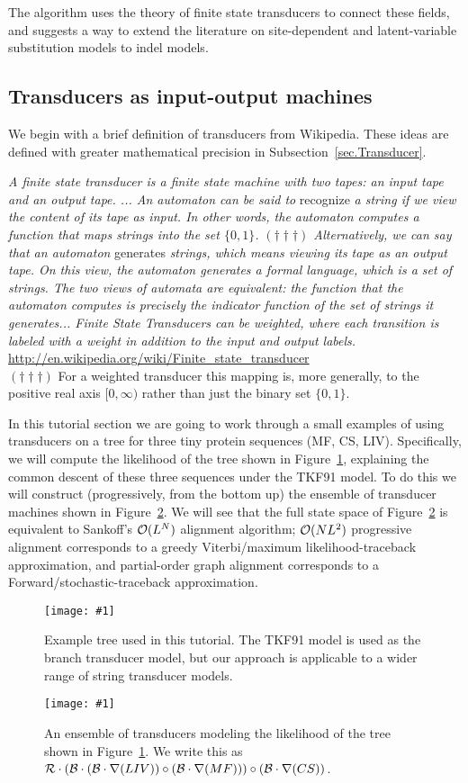 \documentclass{article}
\newcommand{\secref}[1]{Subsection~\ref{sec.#1}}
\newcommand{\figref}[1]{Figure~\ref{Figures.#1}}
\newcommand{\figlabel}[1]{\label{Figures.#1}}
\newcommand{\easyfig}[4]{
\begin{figure}
\texttt{[image: \#1]}
\caption{ \figlabel{#3} #4}
\end{figure}}
\newcommand{\pdffig}[2]{\easyfig{#1-fig.pdf}{}{#1}{#2}}
\newcommand\tkf{{\cal B}}
\newcommand\tkfroot{{\cal R}}
\newcommand\fork{\circ}
\newcommand\recognize{\nabla}
\begin{document}
The algorithm uses the theory of finite state transducers to connect these fields,
and suggests a way to extend the literature on
site-dependent and latent-variable substitution models \cite{Yang94,Bruno96,YangEtAl2000,HolmesRubin2002b}
to indel models.


\subsection{Transducers as input-output machines}

We begin with a brief definition of transducers from Wikipedia.  
These ideas are defined with greater mathematical precision in \secref{Transducer}.

{\em A finite state transducer is a finite state machine with two tapes: an input tape and an output tape. ... An automaton can be said to } recognize {\em a string if we view the content of its tape as input. In other words, the automaton computes a function that maps strings into the set $\{0,1\}$. $(\dagger\dagger\dagger)$ Alternatively, we can say that an automaton } generates {\em strings, which means viewing its tape as an output tape. On this view, the automaton generates a formal language, which is a set of strings. The two views of automata are equivalent: the function that the automaton computes is precisely the indicator function of the set of strings it generates... Finite State Transducers can be weighted, where each transition is labeled with a weight in addition to the input and output labels. }
\url{http://en.wikipedia.org/wiki/Finite_state_transducer}
\\
$(\dagger\dagger\dagger)$ For a weighted transducer this mapping is,
more generally, to the positive real axis $[0,\infty)$
rather than just the binary set $\{0,1\}$.

In this tutorial section we are going to work through a small examples of using transducers on a tree
for three tiny protein sequences (MF, CS, LIV).
Specifically, we will compute the likelihood of the tree shown in \figref{cs-mf-liv-tree},
explaining the common descent of these three sequences
under the TKF91 model.
To do this we will construct (progressively, from the bottom up) the ensemble of transducer machines shown in \figref{cs-mf-liv-machines}.
We will see that the full state space of \figref{cs-mf-liv-machines} is equivalent to Sankoff's ${\cal O}(L^N)$ alignment algorithm;
${\cal O}(NL^2)$ progressive alignment corresponds to a greedy Viterbi/maximum likelihood-traceback approximation,
and partial-order graph alignment corresponds to a Forward/stochastic-traceback approximation.
\pdffig{cs-mf-liv-tree}{Example tree used in this tutorial.  
The TKF91 model is used as the branch transducer model, but our approach 
is applicable to a wider range of string transducer models.  }
\pdffig{cs-mf-liv-machines}{An ensemble of transducers modeling the likelihood of the tree shown in \figref{cs-mf-liv-tree}.
We write this as $\tkfroot \cdot (\tkf \cdot (\tkf \cdot \recognize(LIV))\fork(\tkf \cdot \recognize(MF)))\fork(\tkf \cdot \recognize(CS))$. }
\end{document}
